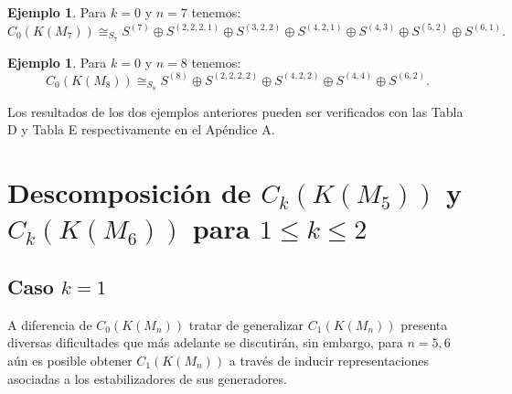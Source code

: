 \documentclass[12pt]{book}
\theoremstyle{definition}
\newtheorem{example}[theorem]{Ejemplo}
\newcounter{in}
\begin{document}
\begin{example}
Para $k =0$ y $n = 7$ tenemos:
\begin{equation}
C_{0}(K(M_{7})) \cong_{S_{7}}  S^{(7)} \oplus S^{(2,2,2,1)} \oplus S^{(3,2,2)} \oplus S^{(4,2,1)} \oplus S^{(4,3)} \oplus S^{(5,2)} \oplus S^{(6,1)}.
\end{equation}
\end{example}
\begin{example}
Para $k =0$ y $n = 8$ tenemos:
\begin{equation}
C_{0}(K(M_{8})) \cong_{S_{8}}  S^{(8)} \oplus S^{(2,2,2,2)} \oplus S^{(4,2,2)} \oplus S^{(4,4)} \oplus S^{(6,2)}.
\end{equation}
\end{example}
Los resultados de los dos ejemplos anteriores pueden ser verificados
con las Tabla D y Tabla E respectivamente en el Apéndice A.

\section[Casos particulares de descomposición]{Descomposición de $C_{k}(K(M_5))$ y $C_{k}(K(M_6))$ para $1 \leq k \leq 2$}
\subsection{Caso $k = 1$}
\label{Ind_est_o_1}

A diferencia de $C_{0}(K(M_n))$ tratar de generalizar $C_{1}(K(M_n))$
presenta diversas dificultades que más adelante se discutirán, sin
embargo, para $n = 5, 6$ aún es posible obtener $C_{1}(K(M_n))$ a
través de inducir representaciones asociadas a los estabilizadores de
sus generadores.
\end{document}
